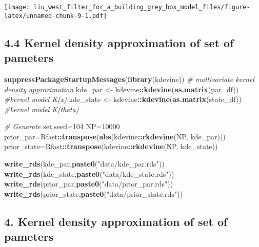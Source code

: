 \documentclass[
]{article}
\newenvironment{Shaded}{\begin{snugshade}}{\end{snugshade}}
\newcommand{\CommentTok}[1]{\textcolor[rgb]{0.56,0.35,0.01}{\textit{#1}}}
\newcommand{\DecValTok}[1]{\textcolor[rgb]{0.00,0.00,0.81}{#1}}
\newcommand{\KeywordTok}[1]{\textcolor[rgb]{0.13,0.29,0.53}{\textbf{#1}}}
\newcommand{\NormalTok}[1]{#1}
\newcommand{\OperatorTok}[1]{\textcolor[rgb]{0.81,0.36,0.00}{\textbf{#1}}}
\newcommand{\StringTok}[1]{\textcolor[rgb]{0.31,0.60,0.02}{#1}}
\begin{document}
\texttt{[image: liu\_west\_filter\_for\_a\_building\_grey\_box\_model\_files/figure-latex/unnamed-chunk-9-1.pdf]}

\hypertarget{kernel-density-approximation-of-set-of-pameters}{%
\subsection{4.4 Kernel density approximation of set of
pameters}\label{kernel-density-approximation-of-set-of-pameters}}

\begin{Shaded}
\begin{Highlighting}[]
\KeywordTok{suppressPackageStartupMessages}\NormalTok{(}\KeywordTok{library}\NormalTok{(kdevine))}
\CommentTok{# multivariate kernel density approximation}
\NormalTok{kde_par <-}\StringTok{ }\NormalTok{kdevine}\OperatorTok{::}\KeywordTok{kdevine}\NormalTok{(}\KeywordTok{as.matrix}\NormalTok{(par_df)) }\CommentTok{#kernel model K(x)}
\NormalTok{kde_state <-}\StringTok{ }\NormalTok{kdevine}\OperatorTok{::}\KeywordTok{kdevine}\NormalTok{(}\KeywordTok{as.matrix}\NormalTok{(state_df)) }\CommentTok{#kernel model K(theta)}

\CommentTok{# Generate }
\NormalTok{set.seed=}\DecValTok{104}
\NormalTok{NP=}\DecValTok{10000}
\NormalTok{prior_par=Rfast}\OperatorTok{::}\KeywordTok{transpose}\NormalTok{(}\KeywordTok{abs}\NormalTok{(kdevine}\OperatorTok{::}\KeywordTok{rkdevine}\NormalTok{(NP, kde_par)))}
\NormalTok{prior_state=Rfast}\OperatorTok{::}\KeywordTok{transpose}\NormalTok{(kdevine}\OperatorTok{::}\KeywordTok{rkdevine}\NormalTok{(NP, kde_state))}


\KeywordTok{write_rds}\NormalTok{(kde_par,}\KeywordTok{paste0}\NormalTok{(}\StringTok{"data/kde_par.rds"}\NormalTok{))}
\KeywordTok{write_rds}\NormalTok{(kde_state,}\KeywordTok{paste0}\NormalTok{(}\StringTok{"data/kde_state.rds"}\NormalTok{))}
\KeywordTok{write_rds}\NormalTok{(prior_par,}\KeywordTok{paste0}\NormalTok{(}\StringTok{"data/prior_par.rds"}\NormalTok{))}
\KeywordTok{write_rds}\NormalTok{(prior_state,}\KeywordTok{paste0}\NormalTok{(}\StringTok{"data/prior_state.rds"}\NormalTok{))}
\end{Highlighting}
\end{Shaded}

\hypertarget{kernel-density-approximation-of-set-of-pameters-1}{%
\subsection{4. Kernel density approximation of set of
pameters}\label{kernel-density-approximation-of-set-of-pameters-1}}
\end{document}
